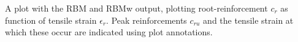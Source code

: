 \documentclass[a4 paper, 11  pt]{article}
\begin{document}
A plot with the RBM and RBMw output, plotting root-reinforcement $c_r$ as function of tensile strain $\epsilon_r$. Peak reinforcements $c_{ru}$ and the tensile strain at which these occur are indicated using plot annotations.



 

\end{document}
